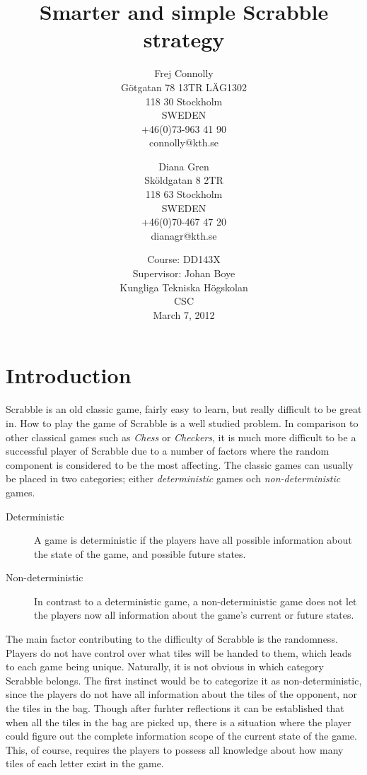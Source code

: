 \documentclass[a4paper, 12pt]{report}
\begin{document}
\title{Smarter and simple Scrabble strategy}
\date{Course: DD143X \\ Supervisor: Johan Boye \\ Kungliga Tekniska Högskolan \\ CSC \\ March 7, 2012}
\author{Frej Connolly \\ Götgatan 78 13TR LÄG1302 \\ 118 30 Stockholm \\ SWEDEN \\ +46(0)73-963 41 90 \\ connolly@kth.se \\
        \and Diana Gren \\ Sköldgatan 8 2TR \\ 118 63 Stockholm \\ SWEDEN \\ +46(0)70-467 47 20 \\ dianagr@kth.se}

\maketitle
\tableofcontents

\chapter{Introduction}
Scrabble is an old classic game, fairly easy to learn, but really difficult to be great in. How to play the game of Scrabble is a well studied problem. In comparison to other classical games such as \emph{Chess} or \emph{Checkers}, it is much more difficult to be a successful player of Scrabble due to a number of factors where the random component is considered to be the most affecting. The classic games can usually be placed in two categories; either \emph{deterministic} games och \emph{non-deterministic} games.

\begin{description}
\item[Deterministic] A game is deterministic if the players have all possible information about the state of the game, and possible future states.
\item[Non-deterministic] In contrast to a deterministic game, a non-deterministic game does not let the players now all information about the game's current or future states.
\end{description}

The main factor contributing to the difficulty of Scrabble is the randomness. Players do not have control over what tiles will be handed to them, which leads to each game being unique. Naturally, it is not obvious in which category Scrabble belongs. The first instinct would be to categorize it as non-deterministic, since the players do not have all information about the tiles of the opponent, nor the tiles in the bag. Though after furhter reflections it can be established that when all the tiles in the bag are picked up, there is a situation where the player could figure out the complete information scope of the current state of the game. This, of course, requires the players to possess all knowledge about how many tiles of each letter exist in the game.
\end{document}
